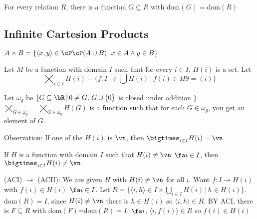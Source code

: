 \begin{axiom}
    For every relation $R$, there is a function $G \subseteq R$ with dom$(G)=$dom$(R)$
\end{axiom}

\subsection{Infinite Cartesion Products}

$A \times B = \{ \langle x, y \rangle \in \cP \cP (A \cup B) \, | \, x \in A \wedge y \in B\}$ 

\begin{definition}
    Let $M$ be a function with domain $I$ such that for every $i \in I$, $H(i)$ is a set. Let 
    \[\bigtimes_{i \in I} H(i) - \{ f: I \to \bigcup H(i) \, | \, f(i) \in H9=(i) \} \] 
\end{definition}

\begin{example}
    Let $\omega_g$ be $\{ G \subseteq \bR \, | \, 0 \neq G, \, G \cup \{0\}$ is closed under addition $\}$ \\
    $\bigtimes_{G \in \omega_g} = \bigtimes_{G \in \omega_g}H(G)$ is a function such that for each $G \in \omega_g$, you get an element of $G$. 
\end{example}

\noindent
Observation: If one of the $H(i)$ is $\vn$, then $\bigtimes_{i \in I}H(i) = \vn$ 

\begin{axiom}
    If $H$ is a function with domain $I$ such that $H(i) \neq \vn$ $\fa i \in I$, then $\bigtimes_{i \in I}H(i) \neq \vn$ 
\end{axiom}

\noindent
(ACI) $\to$ (ACII): We are given $H$ with $H(i) \neq \vn$ for all $i$. Want $f: I \to H(i)$ with $f(i) \in H(i)$ $\fa i \in I$. Let $R = \{ \langle i, h \rangle \in I \times \bigcup_{i \in I}H(i) \, | \, h \in H(i) \}$. dom$(R)=I$, since $H(i) \neq \vn$ there is $h \in H(i)$ so $\langle i , h \rangle \in R$. BY ACI, there is $F \subseteq R$ with dom$(F)$=dom$(R) =I$. $\fa i$, $\langle i, f(i)\rangle \in R$ so $f(i) \in H(i)$ 